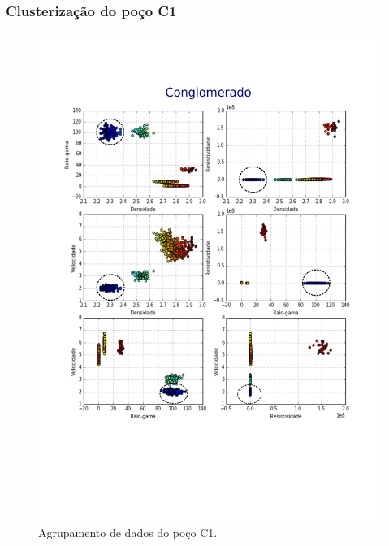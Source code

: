 \documentclass[10pt]{beamer} %
\begin{document}
\begin{frame}
	\frametitle{Clusterização do poço C1}
	\begin{figure}[H]
		\centering
		\includegraphics[scale=0.3]{Imagens/conglomeradoC1.png}
		\caption{Agrupamento de dados do poço C1.}
	\end{figure} 
\end{frame}
\end{document}
